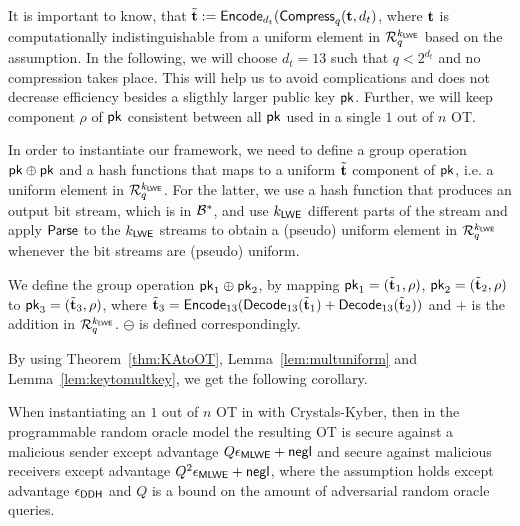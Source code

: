 It is important to know, that $\tilde{{\mathbf t}}:=\mathsf{Encode}_{d_t}(\mathsf{Compress}_q({\mathbf t}, d_t)$, where ${\mathbf t}$ is computationally indistinguishable from a uniform element in $\mathcal R_q^{k_{\mathsf{LWE}}}$ based on the \MLWE assumption. In the following, we will choose $d_t=13$ such that $q<2^{d_t}$ and no compression takes place. This will help us to avoid complications and does not decrease efficiency besides a sligthly larger public key $\mathsf{pk}$. Further, we will keep component $\rho$ of $\mathsf{pk}$ consistent between all $\mathsf{pk}$ used in a single $1$ out of $n$ OT.

In order to instantiate our framework, we need to define a group operation $\mathsf{pk}\oplus\mathsf{pk}$ and a hash functions that maps to a uniform $\tilde{{\mathbf t}}$ component of $\mathsf{pk}$, i.e. a uniform element in $\mathcal R_q^{k_{\mathsf{LWE}}}$. For the latter, we use a hash function that produces an output bit stream, which is in $\mathcal{B}^{*}$, and use $k_{\mathsf{LWE}}$ different parts of the stream and apply $\mathsf{Parse}$ to the $k_{\mathsf{LWE}}$ streams to obtain a (pseudo) uniform element in $\mathcal R_q^{k_{\mathsf{LWE}}}$ whenever the bit streams are (pseudo) uniform.

We define the group operation $\mathsf{pk}_1\oplus\mathsf{pk}_2$, by mapping $\mathsf{pk}_1=(\tilde{{\mathbf t}}_1,\rho)$, $\mathsf{pk}_2=(\tilde{{\mathbf t}}_2,\rho)$ to $\mathsf{pk}_3=(\tilde{{\mathbf t}}_3, \rho)$, where $\tilde{{\mathbf t}}_3=\mathsf{Encode}_{13}(\mathsf{Decode}_{13}(\tilde{{\mathbf t}}_1)+\mathsf{Decode}_{13}(\tilde{{\mathbf t}}_2))$ and $+$ is the addition in $\mathcal R_q^{k_{\mathsf{LWE}}}$. $\ominus$ is defined correspondingly. 

By using Theorem~\ref{thm:KAtoOT}, Lemma~\ref{lem:multuniform} and Lemma~\ref{lem:keytomultkey}, we get the following corollary.
 
\begin{corollary}
When instantiating an $1$ out of $n$ OT in  with Crystals-Kyber, then in the programmable random oracle model the resulting OT is secure against a malicious sender except advantage $Q\epsilon_{\mathsf{MLWE}}+\mathsf{negl}$  and secure against malicious receivers except advantage $Q^2\epsilon_{\mathsf{MLWE}}+\mathsf{negl}$, where the \MLWE assumption holds except advantage $\epsilon_{\mathsf{DDH}}$ and $Q$ is a bound on the amount of adversarial random oracle queries.
\end{corollary}